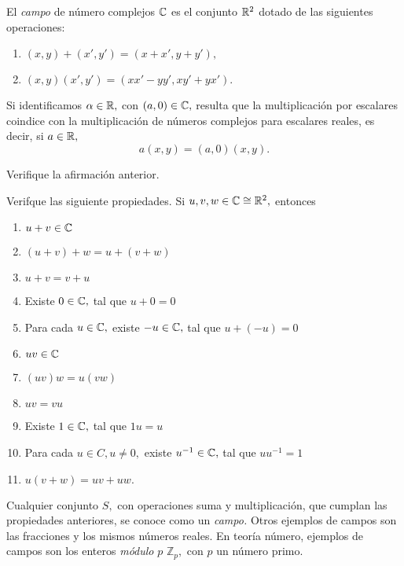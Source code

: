 \begin{defn}
 El \emph{campo} de número complejos $\mathbb{C}$ es el conjunto $\mathbb{R}^{2}$ dotado de las siguientes operaciones:
 \begin{enumerate}
  \item
  $
(x,y)+(x',y')=(x+x',y+y'),
  $
  \item
  $
(x,y)(x',y')=(xx'-yy',xy'+yx').
  $
 \end{enumerate}
\end{defn}


Si identificamos $\alpha \in \mathbb{R},$ con $(a,0) \in \mathbb{C},$ resulta que la multiplicación por escalares coindice con la
multiplicación de números complejos para escalares reales, es decir, si $a\in \mathbb{R},$
$$
a(x,y)=(a,0)(x,y).
$$

\begin{problema}
 Verifique la afirmación anterior.
 \end{problema}

 
 \begin{problema}
  Verifque las siguiente propiedades. Si $u,v,w \in \mathbb{C} \cong \mathbb{R}^{2},$ entonces
  \begin{enumerate}
   \item $u+v\in \mathbb{C}$ 
   \item $(u+v)+w=u+(v+w)$
   \item $u+v=v+u$
   \item Existe $0\in \mathbb{C},$ tal que $u+0=0$
   \item Para cada $u\in \mathbb{C},$ existe $-u\in\mathbb{C},$ tal que $u+(-u)=0$
   \item $uv \in \mathbb{C}$
   \item $(uv)w=u(vw)$
   \item $uv=vu$
   \item Existe $1\in \mathbb{C},$ tal que $1u=u$
   \item Para cada $u\in C, u \neq 0,$ existe $u^{-1}\in \mathbb{C},$ tal que $u u^{-1}=1$
   \item $u(v+w)=uv+uw.$
   \end{enumerate}
   
 \end{problema}

 \begin{rem}
  Cualquier conjunto $S,$ con operaciones suma y multiplicación, que cumplan las propiedades anteriores, se conoce como
un \emph{campo.} Otros ejemplos de campos son las fracciones y los mismos números reales. En teoría número, ejemplos de
campos son los enteros \emph{módulo} $p$ $\mathbb{Z}_{p},$ con $p$ un número primo.
 \end{rem}

